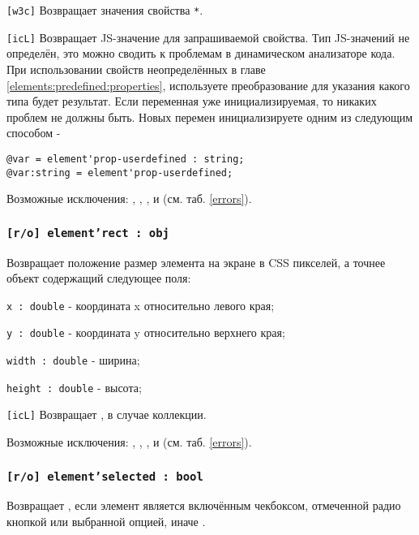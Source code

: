 \texttt{[w3c]} Возвращает значения свойства \texttt{*}.

\texttt{[icL]}  Возвращает JS-значение для запрашиваемой свойства. Тип JS-значений не определён, это можно сводить к проблемам в динамическом анализаторе кода. При использовании свойств неопределённых в главе \ref{elements:predefined:properties}, используете преобразование для указания какого типа будет результат. Если переменная уже инициализируемая, то никаких проблем не должны быть. Новых перемен инициализируете одним из следующим способом -
\begin{verbatim}
@var = element'prop-userdefined : string;
@var:string = element'prop-userdefined;
\end{verbatim}

Возможные исключения: , , ,  и  (см. таб. \ref{errors}).

\subsubsection{\texttt{[r/o] element'rect : obj}}

Возвращает положение размер элемента на экране в CSS пикселей, а точнее объект содержащий следующее поля:
\begin{icItems}
	\item \texttt{x : double} - координата x относительно левого края;
	\item \texttt{y : double} - координата y относительно верхнего края;
	\item \texttt{width : double} - ширина;
	\item \texttt{height : double} - высота;
\end{icItems}

\texttt{[icL]} Возвращает \set, в случае коллекции.

Возможные исключения: , , ,  и  (см. таб. \ref{errors}).

\subsubsection{\texttt{[r/o] element'selected : bool}}

Возвращает \true, если элемент является включённым чекбоксом, отмеченной радио кнопкой или выбранной опцией, иначе \false.

